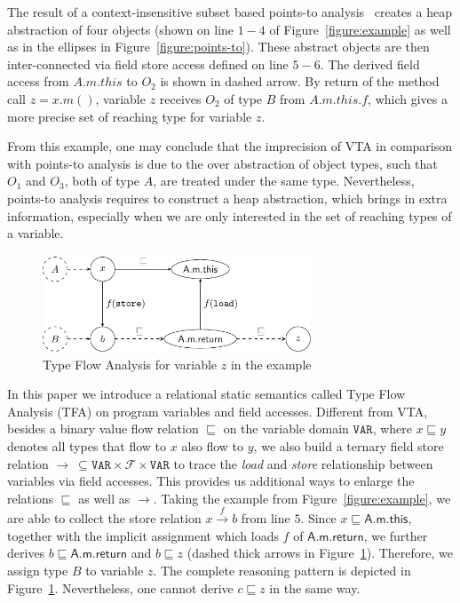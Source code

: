 \documentclass{llncs}
\newcommand\Var{\mathtt{VAR}}
\newcommand{\Field}{\mathcal{F}}
\newcommand{\less}{\sqsubseteq}
\newcommand{\hflow}{\longrightarrow}
\newcommand{\lhflow}[1]{\stackrel{#1}{\hflow}}
\begin{document}
The result of a context-insensitive subset based points-to analysis~\cite{andersen94} creates a heap abstraction of four objects (shown on line $1-4$ of Figure~\ref{figure:example} as well as in the ellipses in Figure~\ref{figure:points-to}). These abstract objects are then inter-connected via field store access defined on line $5-6$. The derived field access from $A.m.this$ to $O_2$ is shown in dashed arrow. By return of the method call $z=x.m()$, variable $z$ receives $O_2$ of type $B$ from $A.m.this.f$, which gives a more precise set of reaching type for variable $z$.

From this example, one may conclude that the imprecision of VTA in comparison with points-to analysis is due to the over abstraction of object types, such that $O_1$ and $O_3$, both of type $A$, are treated under the same type. Nevertheless, points-to analysis requires to construct a heap abstraction, which brings in extra information, especially when we are only interested in the set of reaching types of a variable.

\begin{figure}[t!]
\centering
\includegraphics[width=8cm]{tfa.pdf}
\caption{Type Flow Analysis for variable $z$ in the example}\label{fig:tfa}
\end{figure}

In this paper we introduce a relational static semantics called Type Flow Analysis (TFA) on program variables and field accesses. Different from VTA, besides a binary value flow relation $\less$ on the variable domain $\Var$, where $x\less y$ denotes all types that flow to $x$ also flow to $y$, we also build a ternary field store relation $\rightarrow\ \subseteq\Var\times\Field\times\Var$ to trace the \emph{load} and \emph{store} relationship between variables via field accesses. This provides us additional ways to enlarge the relations $\less$ as well as $\rightarrow$. %
Taking the example from Figure~\ref{figure:example}, we are able to collect the store relation $x\lhflow{f}b$ from line $5$. Since $x\less \textsf{A.m.this}$, together with the implicit assignment which loads $f$ of $\textsf{A.m.return}$, we further derives $b\less\textsf{A.m.return}$ and $b\less z$ (dashed thick arrows in Figure~\ref{fig:tfa}). Therefore, we assign type $B$ to variable $z$. The complete reasoning pattern is depicted in Figure~\ref{fig:tfa}. Nevertheless, one cannot derive $c\less z$ in the same way.
\end{document}
